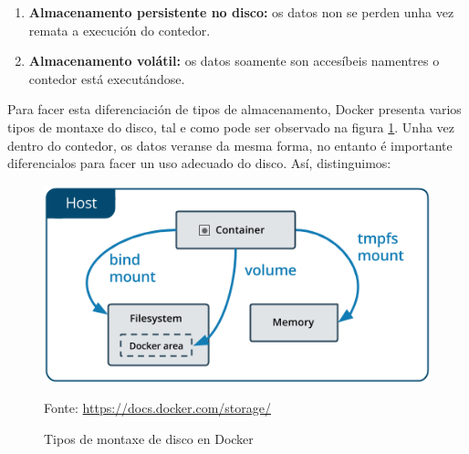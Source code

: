 \begin{enumerate}
    \item \textbf{Almacenamento persistente no disco:} os datos non se perden unha vez remata a execución do contedor.
    \item \textbf{Almacenamento volátil:} os datos soamente son accesíbeis namentres o contedor está executándose.
\end{enumerate}

Para facer esta diferenciación de tipos de almacenamento, Docker presenta varios tipos de montaxe do disco, tal e como pode ser observado na figura \ref{typesOfMountsDocker}. Unha vez dentro do contedor, os datos veranse da mesma forma, no entanto é importante diferencialos para facer un uso adecuado do disco. Así, distinguimos:

\begin{figure}
\centerline{\includegraphics[width=15cm]{figuras/typesOfMountsDocker.png}}
\caption{Tipos de montaxe de disco en Docker}
\small
\centerline{Fonte: \url{https://docs.docker.com/storage/}}
\label{typesOfMountsDocker}
\end{figure}

